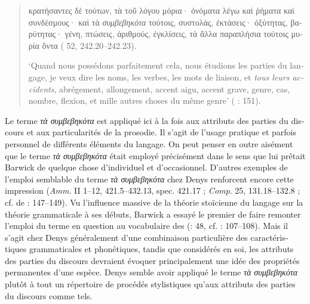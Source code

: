 \documentclass[output=paper]{langsci/langscibook}
\begin{document}
\begin{otherlanguage}{french}
\begin{quote}
    \begin{otherlanguage}{greek}
    κρατήσαντες δὲ τούτων, τὰ τοῦ λόγου μόρια· ὀνόματα λέγω καὶ ῥήματα καὶ συνδέσμους· καὶ τὰ \textit{συμβεβηκότα} τούτοις, συστολάς, ἐκτάσεις· ὀξύ\-τη\-τας, βαρύτητας· γένη, πτώσεις, ἀριθμούς, ἐγκλίσεις, τὰ ἄλλα παραπλήσια τούτοις μυρία ὄντα ( 52, 242.20--242.23).
    \end{otherlanguage}
    
    `Quand nous possédons parfaitement cela, nous étudions les parties du langage, je veux dire les noms, les verbes, les mots de liaison, et \textit{tous leurs accidents}, abrégement, allongement, accent aigu, accent grave, genre, cas, nombre, flexion, et mille autres choses du même genre' (\citealt{aujac_denys_1988} : 151).
\end{quote}

Le terme \textit{τὰ συμβεβηκότα} est appliqué ici à la fois aux attributs des parties du discours et aux particularités de la prosodie. Il s’agit de l’usage pratique et parfois personnel de différents éléments du langage. On peut penser en outre aisément que le terme \textit{τὰ συμβεβηκότα} était employé précisément dans le sens que lui prêtait Barwick de quelque chose d’individuel et d’occasionnel. D’autres exemples de l’emploi semblable du terme \textit{τὰ συμβεβηκότα} chez Denys renforcent encore cette impression (\textit{Amm}. II 1–12, 421.5–432.13, spec. 421.17 ; \textit{Comp}. 25, 131.18–132.8 ; cf. de \citealt{jonge_between_2008}: 147–149). Vu l’influence massive de la théorie stoïcienne du langage sur la théorie grammaticale à ses débuts, Barwick a essayé le premier de faire remonter l’emploi du terme en question au vocabulaire des  (\citealt{barwick_probleme_1957}: 48, cf. \citealt{barwick_remmius_1922}: 107–108). Mais il s’agit chez Denys généralement d’une combinaison particulière des caractéristiques grammaticales et phonétiques, tandis que considérés en soi, les attributs des parties du discours devraient évoquer principalement une idée des propriétés permanentes d’une espèce. Denys semble avoir appliqué le terme \textit{τὰ συμβεβηκότα} plutôt à tout un répertoire de procédés stylistiques qu’aux attributs des parties du discours comme tels. 


\end{otherlanguage}
\end{document}
